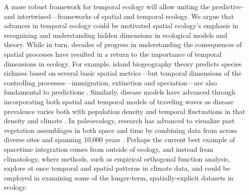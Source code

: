 \documentclass[11pt,a4paper,oneside]{article}
\begin{document}
\noindent A more robust framework for temporal ecology will allow uniting the predictive--and intertwined---frameworks of spatial and temporal ecology. We argue that advances in temporal ecology could be motivated spatial ecology's emphasis in recognizing and understanding hidden dimensions in ecological models and theory. While in turn, decades of progress in understanding the consequences of spatial processes have resulted in a return to the importance of temporal dimensions in ecology. For example, island biogeography theory predicts species richness based on several basic spatial metrics---but temporal dimensions of the controlling processes---immigration, extinction and speciation---are also fundamental to predictions \citep{Wiens2011}. Similarly, disease models have advanced through incorporating both spatial and temporal models of traveling waves as disease prevalence varies both with population density and temporal fluctuations in that density \citep{Grenfell:2001ox} and climate \citep{lipp2002}. In paleoecology, research has advanced to visualize past vegetation assemblages in both space and time by combining data from across diverse sites and spanning 10,000 years \citep{Brewer2012}. Perhaps the current best example of spacetime integration comes from outside of ecology, and instead from climatology, where methods, such as empirical orthogonal function analysis, explore at once temporal and spatial patterns in climate data, and could be employed in examining some of the longer-term, spatially-explicit datasets in ecology.
\end{document}
